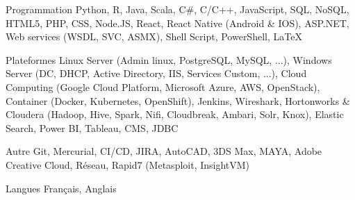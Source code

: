 

\begin{cvskills}

  \cvskill
    {Programmation}
	{Python, R, Java, Scala, C\#, C/C++, JavaScript, SQL, NoSQL, HTML5, PHP, CSS, Node.JS, React, React Native (Android \& IOS), ASP.NET, Web services (WSDL, SVC, ASMX), Shell Script, PowerShell, LaTeX}

  \cvskill
    {Plateformes}
    {Linux Server (Admin linux, PostgreSQL, MySQL, ...), Windows Server (DC, DHCP, Active Directory, IIS, Services Custom, ...), Cloud Computing (Google Cloud Platform, Microsoft Azure, AWS, OpenStack), Container (Docker, Kubernetes, OpenShift), Jenkins, Wireshark, Hortonworks \& Cloudera (Hadoop, Hive, Spark, Nifi, Cloudbreak, Ambari, Solr, Knox), Elastic Search, Power BI, Tableau, CMS, JDBC}

  \cvskill
    {Autre} %
    {Git, Mercurial, CI/CD, JIRA, AutoCAD, 3DS Max, MAYA, Adobe Creative Cloud, Réseau, Rapid7 (Metasploit, InsightVM)}
	
  \cvskill
    {Langues}
    {Français, Anglais}

\end{cvskills}
